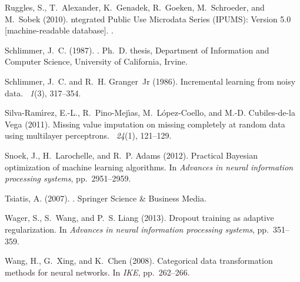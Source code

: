 \documentclass[10pt]{book}
\theoremstyle{definition}
\begin{document}
\begin{thebibliography}{11}
Ruggles, S., T.~Alexander, K.~Genadek, R.~Goeken, M.~Schroeder, and M.~Sobek
  (2010).
ntegrated {P}ublic {U}se {M}icrodata {S}eries ({IPUMS}): Version
  5.0 [machine-readable database].
.

Schlimmer, J.~C. (1987).
.
\newblock Ph.\ D. thesis, Department of Information and Computer Science,
  University of California, Irvine.

Schlimmer, J.~C. and R.~H. Granger~Jr (1986).
\newblock Incremental learning from noisy data.
~{\em 1\/}(3), 317--354.

Silva-Ram{\'\i}rez, E.-L., R.~Pino-Mej{\'\i}as, M.~L{\'o}pez-Coello, and M.-D.
  Cubiles-de-la Vega (2011).
\newblock Missing value imputation on missing completely at random data using
  multilayer perceptrons.
~{\em 24\/}(1), 121--129.

Snoek, J., H.~Larochelle, and R.~P. Adams (2012).
\newblock Practical {B}ayesian optimization of machine learning algorithms.
\newblock In {\em Advances in neural information processing systems}, pp.\
  2951--2959.

Tsiatis, A. (2007).
.
\newblock Springer Science \& Business Media.

Wager, S., S.~Wang, and P.~S. Liang (2013).
\newblock Dropout training as adaptive regularization.
\newblock In {\em Advances in neural information processing systems}, pp.\
  351--359.

Wang, H., G.~Xing, and K.~Chen (2008).
\newblock Categorical data transformation methods for neural networks.
\newblock In {\em IKE}, pp.\  262--266.


\end{thebibliography}
\end{document}
